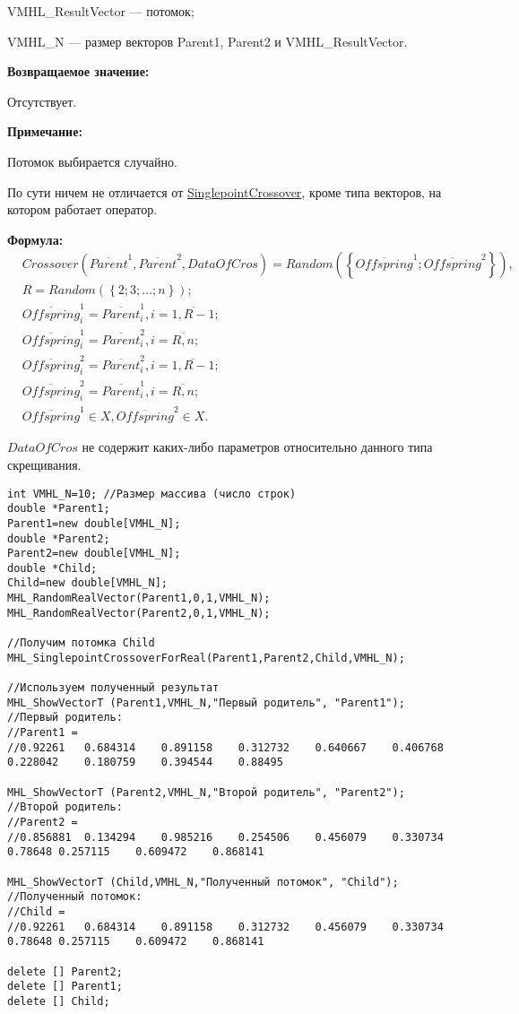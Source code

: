 \documentclass[a4paper,12pt]{article}
\begin{document}
VMHL\_ResultVector --- потомок;
 
VMHL\_N --- размер векторов Parent1, Parent2 и VMHL\_ResultVector.

\textbf{Возвращаемое значение:}

 Отсутствует.
 
\textbf{ Примечание:}

 Потомок выбирается случайно.
 
По сути ничем не отличается от \hyperref[SetOfOperatorsAlgorithms:SinglepointCrossover]{SinglepointCrossover}, кроме типа векторов, на котором работает оператор.
 
 \textbf{Формула:}
\begin{align}
&Crossover \left( \overline{Parent}^1, \overline{Parent}^2, DataOfCros\right)=Random \left(\left\lbrace \overline{Offspring}^1; \overline{Offspring}^2\right\rbrace  \right), \nonumber\\
&R=Random\left( \left\lbrace 2; 3; \ldots; n\right\rbrace \right); \nonumber \\
& \overline{Offspring}^1_i=\overline{Parent}^1_i, i=\overline{1,R-1};\nonumber\\
&  \overline{Offspring}^1_i=\overline{Parent}^2_i, i=\overline{R,n};\nonumber\\
&\overline{Offspring}^2_i=\overline{Parent}^2_i, i=\overline{1,R-1};\nonumber\\
& \overline{Offspring}^2_i=\overline{Parent}^1_i, i=\overline{R,n};\nonumber\\
&\overline{Offspring}^1\in X, \overline{Offspring}^2\in X.\nonumber
\end{align}

$ DataOfCros $ не содержит каких-либо параметров относительно данного типа скрещивания.


\begin{lstlisting}[label=code_use_MHL_SinglepointCrossoverForReal,caption=Пример использования]
int VMHL_N=10; //Размер массива (число строк)
double *Parent1;
Parent1=new double[VMHL_N];
double *Parent2;
Parent2=new double[VMHL_N];
double *Child;
Child=new double[VMHL_N];
MHL_RandomRealVector(Parent1,0,1,VMHL_N);
MHL_RandomRealVector(Parent2,0,1,VMHL_N);

//Получим потомка Child
MHL_SinglepointCrossoverForReal(Parent1,Parent2,Child,VMHL_N);

//Используем полученный результат
MHL_ShowVectorT (Parent1,VMHL_N,"Первый родитель", "Parent1");
//Первый родитель:
//Parent1 =	
//0.92261	0.684314	0.891158	0.312732	0.640667	0.406768	0.228042	0.180759	0.394544	0.88495

MHL_ShowVectorT (Parent2,VMHL_N,"Второй родитель", "Parent2");
//Второй родитель:
//Parent2 =	
//0.856881	0.134294	0.985216	0.254506	0.456079	0.330734	0.78648	0.257115	0.609472	0.868141

MHL_ShowVectorT (Child,VMHL_N,"Полученный потомок", "Child");
//Полученный потомок:
//Child =	
//0.92261	0.684314	0.891158	0.312732	0.456079	0.330734	0.78648	0.257115	0.609472	0.868141

delete [] Parent2;
delete [] Parent1;
delete [] Child;
\end{lstlisting}
\end{document}

